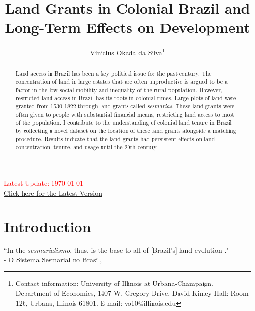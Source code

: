 \documentclass{article}
\title{Land Grants in Colonial Brazil and Long-Term Effects on Development}
\author{Vinicius Okada da Silva\thanks{Contact information: University of Illinois at Urbana-Champaign. Department of Economics, 1407 W. Gregory Drive, David Kinley Hall: Room 126, Urbana, Illinois 61801. E-mail: vo10@illinois.edu}}
\affil{Department of Economics, University of Illinois at Urbana-Champaign}
\date{}
\begin{document}
\maketitle
\thispagestyle{empty} 

\vspace{-.1cm}
\begin{center}
  \textcolor{red}{Latest Update: \today}
  \\
  \href{https://viniokadasilva.github.io/Papers/Sesmarias/02.Draft/02.Second_Draft/Sesmarias_Paper.pdf}{Click here for the Latest Version}
\end{center}
\vspace{.1cm}

\begin{abstract}
  Land access in Brazil has been a key political issue for the past century. The concentration of land in large estates that are often unproductive is argued to be a factor in the low social mobility and inequality of the rural population. However, restricted land access in Brazil has its roots in colonial times. Large plots of land were granted from 1530-1822 through land grants called \textit{sesmarias}. These land grants were often given to people with substantial financial means, restricting land access to most of the population. I contribute to the understanding of colonial land tenure in Brazil by collecting a novel dataset on the location of these land grants alongside a matching procedure. Results indicate that the land grants had persistent effects on land concentration, tenure, and usage until the 20th century.
\end{abstract}

\clearpage
{} 

\section{Introduction}

\begin{displayquote}
  ``In the \textit{sesmarialismo}, thus, is the base to all of [Brazil's] land evolution ."
  \\ 
  \smallskip
  - O Sistema Sesmarial no Brasil, \textcite[p.~25]{Da_Costa_Porto1979-dz}
  \end{displayquote}
\end{document}

